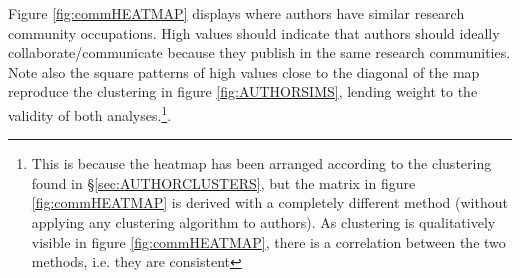 Figure \ref{fig:commHEATMAP} displays where authors have similar research community occupations. High values should indicate that authors should ideally collaborate/communicate because they publish in the same research communities. Note also the square patterns of high values close to the diagonal of the map reproduce the clustering in figure \ref{fig:AUTHORSIMS}, lending weight to the validity of both analyses.\footnote{This is because the heatmap has been arranged according to the clustering found in \S\ref{sec:AUTHORCLUSTERS}, but the matrix in figure \ref{fig:commHEATMAP} is derived with a completely different method (without applying any clustering algorithm to authors). As clustering is qualitatively visible in figure \ref{fig:commHEATMAP}, there is a correlation between the two methods, i.e. they are consistent}.

